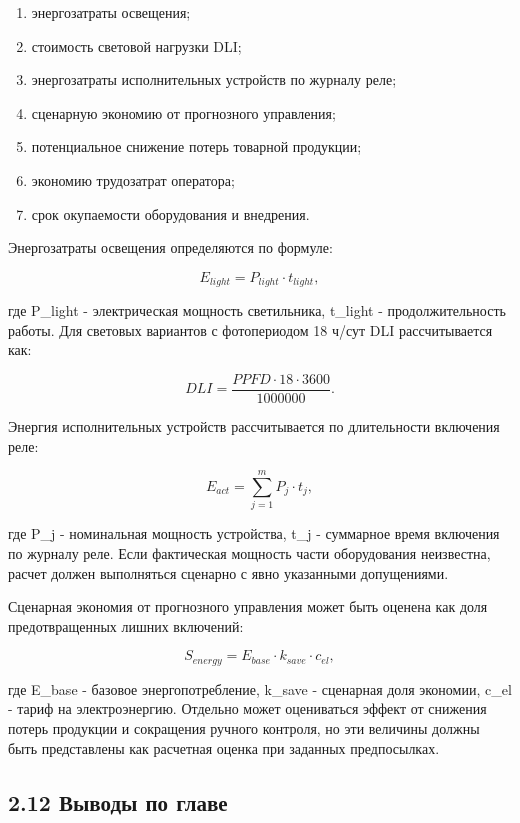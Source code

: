 \documentclass[a4paper,14pt]{extarticle}
\renewcommand{\texttt}[1]{\textnormal{#1}}
\providecommand{\tightlist}{%
  \setlength{\itemsep}{0pt}\setlength{\parskip}{0pt}}
\begin{document}
\begin{enumerate}
\def\labelenumi{\arabic{enumi})}
\tightlist
\item
  энергозатраты освещения;
\item
  стоимость световой нагрузки DLI;
\item
  энергозатраты исполнительных устройств по журналу реле;
\item
  сценарную экономию от прогнозного управления;
\item
  потенциальное снижение потерь товарной продукции;
\item
  экономию трудозатрат оператора;
\item
  срок окупаемости оборудования и внедрения.
\end{enumerate}

Энергозатраты освещения определяются по формуле:

\[
E_{light} = P_{light} \cdot t_{light},
\]

где \texttt{P\_light} - электрическая мощность светильника,
\texttt{t\_light} - продолжительность работы. Для световых вариантов с
фотопериодом 18 ч/сут DLI рассчитывается как:

\[
DLI = \frac{PPFD \cdot 18 \cdot 3600}{1000000}.
\]

Энергия исполнительных устройств рассчитывается по длительности
включения реле:

\[
E_{act} = \sum_{j=1}^{m} P_j \cdot t_j,
\]

где \texttt{P\_j} - номинальная мощность устройства, \texttt{t\_j} -
суммарное время включения по журналу реле. Если фактическая мощность
части оборудования неизвестна, расчет должен выполняться сценарно с явно
указанными допущениями.

Сценарная экономия от прогнозного управления может быть оценена как доля
предотвращенных лишних включений:

\[
S_{energy} = E_{base} \cdot k_{save} \cdot c_{el},
\]

где \texttt{E\_base} - базовое энергопотребление, \texttt{k\_save} -
сценарная доля экономии, \texttt{c\_el} - тариф на электроэнергию.
Отдельно может оцениваться эффект от снижения потерь продукции и
сокращения ручного контроля, но эти величины должны быть представлены
как расчетная оценка при заданных предпосылках.

\subsection{2.12 Выводы по
главе}\label{ux432ux44bux432ux43eux434ux44b-ux43fux43e-ux433ux43bux430ux432ux435}
\end{document}
